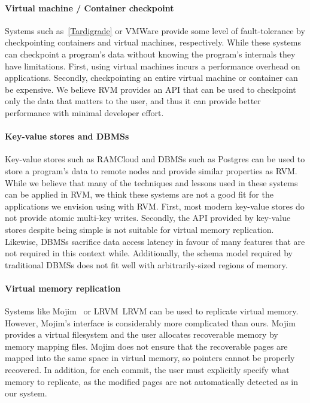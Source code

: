 \paragraph {\bf Virtual machine / Container checkpoint} Systems such
as~\ref{Tardigrade} or VMWare provide some level of fault-tolerance by
checkpointing containers and virtual machines, respectively. While these
systems can checkpoint a program's data without knowing the program's internals
they have limitations. First, using virtual machines incurs a performance
overhead on applications. Secondly, checkpointing an entire virtual machine or
container can be expensive. We believe RVM provides an API that can be used to
checkpoint only the data that matters to the user, and thus it can provide
better performance with minimal developer effort.

\paragraph {\bf Key-value stores and DBMSs} Key-value stores such as RAMCloud
and DBMSs such as Postgres can be used to store a program's data to remote nodes
and provide similar properties as RVM. While we believe that many of the
techniques and lessons used in these systems can be applied in RVM, we think
these systems are not a good fit for the applications we envision using with
RVM. First, most modern key-value stores do not provide atomic multi-key
writes. Secondly, the API provided by key-value stores despite being simple is
not suitable for virtual memory replication. Likewise, DBMSs sacrifice data
access latency in favour of many features that are not required in this context
while. Additionally, the schema model required by traditional DBMSs does not fit
well with arbitrarily-sized regions of memory.

\paragraph {\bf Virtual memory replication} Systems like Mojim~\cite{Mojim} or
LRVM~{LRVM} can be used to replicate virtual memory. However, Mojim's interface
is considerably more complicated than ours. Mojim provides a virtual filesystem
and the user allocates recoverable memory by memory mapping files. Mojim does
not ensure that the recoverable pages are mapped into the same space in virtual
memory, so pointers cannot be properly recovered. In addition, for each commit,
the user must explicitly specify what memory to replicate, as the modified
pages are not automatically detected as in our system.
